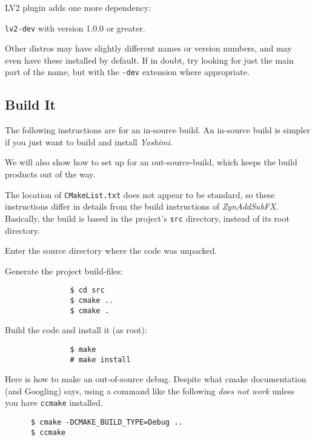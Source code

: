 	LV2 plugin adds one more dependency:

		\texttt{lv2-dev} with version 1.0.0 or greater.

   Other distros may have slightly different names or version numbers, and may
   even have these installed by default. If in doubt, try looking for just the
   main part of the name, but with the \texttt{-dev} extension where
   appropriate.

\subsection{Build It}
\label{subsec:yoshimi_build_it}

   The following instructions are for an in-source build.  An in-source
   build is simpler if you just want to build and install \textsl{Yoshimi}.

   We will also show how to set up for an out-source-build, which keeps
   the build products out of the way.

   The location of \texttt{CMakeList.txt} does not appear to be standard, so
   these instructions differ in details from the build instructions of
   \textsl{ZynAddSubFX}.  Basically, the build is based in the project's
   \texttt{src} directory, instead of its root directory.

   \begin{enumber}
      \item Enter the source directory where the code was unpacked.
      \item Generate the project build-files:
            \begin{verbatim}
               $ cd src
               $ cmake ..
               $ cmake .
            \end{verbatim}
      \item Build the code and install it (as root):
            \begin{verbatim}
               $ make
               # make install
            \end{verbatim}
   \end{enumber}

   Here is how to make an out-of-source debug.  Despite what
   cmake documentation (and Googling) says, using a command like the
   following \textsl{does not work} unless you have \texttt{ccmake}
   installed.

   \begin{verbatim}
      $ cmake -DCMAKE_BUILD_TYPE=Debug ..
      $ ccmake
   \end{verbatim}

